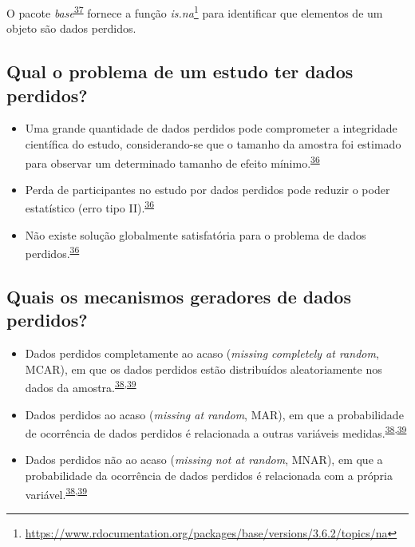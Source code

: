 \documentclass[
  a4paper,
]{book}
\renewcommand{\href}[2]{#2\footnote{\url{#1}}}
\newenvironment{infobox}[1]
  {
  \begin{itemize}
  \renewcommand{\labelitemi}{
    \raisebox{-.7\height}[0pt][0pt]{
      {\setkeys{Gin}{width=3em,keepaspectratio}
        \texttt{[image: \#1]}}
    }
  }
  \setlength{\fboxsep}{1em}
  \begin{blackbox}
  \item
  }
  {
  \end{blackbox}
  \end{itemize}
  }
\begin{document}
\begin{infobox}{images/Rlogo}
O pacote \emph{base}\textsuperscript{\protect\hyperlink{ref-base-2}{37}} fornece a função \href{https://www.rdocumentation.org/packages/base/versions/3.6.2/topics/na}{\emph{is.na}} para identificar que elementos de um objeto são dados perdidos.

\end{infobox}

\hypertarget{qual-o-problema-de-um-estudo-ter-dados-perdidos}{%
\subsection{Qual o problema de um estudo ter dados perdidos?}\label{qual-o-problema-de-um-estudo-ter-dados-perdidos}}

\begin{itemize}
\item
  Uma grande quantidade de dados perdidos pode comprometer a integridade científica do estudo, considerando-se que o tamanho da amostra foi estimado para observar um determinado tamanho de efeito mínimo.\textsuperscript{\protect\hyperlink{ref-Altman2007}{36}}
\item
  Perda de participantes no estudo por dados perdidos pode reduzir o poder estatístico (erro tipo II).\textsuperscript{\protect\hyperlink{ref-Altman2007}{36}}
\item
  Não existe solução globalmente satisfatória para o problema de dados perdidos.\textsuperscript{\protect\hyperlink{ref-Altman2007}{36}}
\end{itemize}

\hypertarget{quais-os-mecanismos-geradores-de-dados-perdidos}{%
\subsection{Quais os mecanismos geradores de dados perdidos?}\label{quais-os-mecanismos-geradores-de-dados-perdidos}}

\begin{itemize}
\item
  Dados perdidos completamente ao acaso (\emph{missing completely at random}, MCAR), em que os dados perdidos estão distribuídos aleatoriamente nos dados da amostra.\textsuperscript{\protect\hyperlink{ref-Heymans2022}{38},\protect\hyperlink{ref-carpenter2021}{39}}
\item
  Dados perdidos ao acaso (\emph{missing at random}, MAR), em que a probabilidade de ocorrência de dados perdidos é relacionada a outras variáveis medidas.\textsuperscript{\protect\hyperlink{ref-Heymans2022}{38},\protect\hyperlink{ref-carpenter2021}{39}}
\item
  Dados perdidos não ao acaso (\emph{missing not at random}, MNAR), em que a probabilidade da ocorrência de dados perdidos é relacionada com a própria variável.\textsuperscript{\protect\hyperlink{ref-Heymans2022}{38},\protect\hyperlink{ref-carpenter2021}{39}}
\end{itemize}
\end{document}
